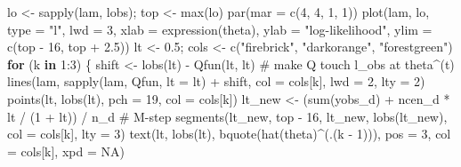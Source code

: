 \documentclass[
  letterpaper,
  DIV=11,
  numbers=noendperiod]{scrreprt}
\newenvironment{Shaded}{\begin{snugshade}}{\end{snugshade}}
\newcommand{\AttributeTok}[1]{\textcolor[rgb]{0.40,0.45,0.13}{#1}}
\newcommand{\CommentTok}[1]{\textcolor[rgb]{0.37,0.37,0.37}{#1}}
\newcommand{\ConstantTok}[1]{\textcolor[rgb]{0.56,0.35,0.01}{#1}}
\newcommand{\ControlFlowTok}[1]{\textcolor[rgb]{0.00,0.23,0.31}{\textbf{#1}}}
\newcommand{\DecValTok}[1]{\textcolor[rgb]{0.68,0.00,0.00}{#1}}
\newcommand{\FloatTok}[1]{\textcolor[rgb]{0.68,0.00,0.00}{#1}}
\newcommand{\FunctionTok}[1]{\textcolor[rgb]{0.28,0.35,0.67}{#1}}
\newcommand{\NormalTok}[1]{\textcolor[rgb]{0.00,0.23,0.31}{#1}}
\newcommand{\OtherTok}[1]{\textcolor[rgb]{0.00,0.23,0.31}{#1}}
\newcommand{\SpecialCharTok}[1]{\textcolor[rgb]{0.37,0.37,0.37}{#1}}
\newcommand{\StringTok}[1]{\textcolor[rgb]{0.13,0.47,0.30}{#1}}
\begin{document}
\begin{Shaded}
\begin{Highlighting}[]
\NormalTok{lo }\OtherTok{\textless{}{-}} \FunctionTok{sapply}\NormalTok{(lam, lobs); top }\OtherTok{\textless{}{-}} \FunctionTok{max}\NormalTok{(lo)}
\FunctionTok{par}\NormalTok{(}\AttributeTok{mar =} \FunctionTok{c}\NormalTok{(}\DecValTok{4}\NormalTok{, }\DecValTok{4}\NormalTok{, }\DecValTok{1}\NormalTok{, }\DecValTok{1}\NormalTok{))}
\FunctionTok{plot}\NormalTok{(lam, lo, }\AttributeTok{type =} \StringTok{"l"}\NormalTok{, }\AttributeTok{lwd =} \DecValTok{3}\NormalTok{, }\AttributeTok{xlab =} \FunctionTok{expression}\NormalTok{(theta),}
     \AttributeTok{ylab =} \StringTok{"log{-}likelihood"}\NormalTok{, }\AttributeTok{ylim =} \FunctionTok{c}\NormalTok{(top }\SpecialCharTok{{-}} \DecValTok{16}\NormalTok{, top }\SpecialCharTok{+} \FloatTok{2.5}\NormalTok{))}
\NormalTok{lt }\OtherTok{\textless{}{-}} \FloatTok{0.5}\NormalTok{; cols }\OtherTok{\textless{}{-}} \FunctionTok{c}\NormalTok{(}\StringTok{"firebrick"}\NormalTok{, }\StringTok{"darkorange"}\NormalTok{, }\StringTok{"forestgreen"}\NormalTok{)}
\ControlFlowTok{for}\NormalTok{ (k }\ControlFlowTok{in} \DecValTok{1}\SpecialCharTok{:}\DecValTok{3}\NormalTok{) \{}
\NormalTok{  shift }\OtherTok{\textless{}{-}} \FunctionTok{lobs}\NormalTok{(lt) }\SpecialCharTok{{-}} \FunctionTok{Qfun}\NormalTok{(lt, lt)            }\CommentTok{\# make Q touch l\_obs at theta\^{}(t)}
  \FunctionTok{lines}\NormalTok{(lam, }\FunctionTok{sapply}\NormalTok{(lam, Qfun, }\AttributeTok{lt =}\NormalTok{ lt) }\SpecialCharTok{+}\NormalTok{ shift, }\AttributeTok{col =}\NormalTok{ cols[k], }\AttributeTok{lwd =} \DecValTok{2}\NormalTok{, }\AttributeTok{lty =} \DecValTok{2}\NormalTok{)}
  \FunctionTok{points}\NormalTok{(lt, }\FunctionTok{lobs}\NormalTok{(lt), }\AttributeTok{pch =} \DecValTok{19}\NormalTok{, }\AttributeTok{col =}\NormalTok{ cols[k])}
\NormalTok{  lt\_new }\OtherTok{\textless{}{-}}\NormalTok{ (}\FunctionTok{sum}\NormalTok{(yobs\_d) }\SpecialCharTok{+}\NormalTok{ ncen\_d }\SpecialCharTok{*}\NormalTok{ lt }\SpecialCharTok{/}\NormalTok{ (}\DecValTok{1} \SpecialCharTok{+}\NormalTok{ lt)) }\SpecialCharTok{/}\NormalTok{ n\_d     }\CommentTok{\# M{-}step}
  \FunctionTok{segments}\NormalTok{(lt\_new, top }\SpecialCharTok{{-}} \DecValTok{16}\NormalTok{, lt\_new, }\FunctionTok{lobs}\NormalTok{(lt\_new), }\AttributeTok{col =}\NormalTok{ cols[k], }\AttributeTok{lty =} \DecValTok{3}\NormalTok{)}
  \FunctionTok{text}\NormalTok{(lt, }\FunctionTok{lobs}\NormalTok{(lt), }\FunctionTok{bquote}\NormalTok{(}\FunctionTok{hat}\NormalTok{(theta)}\SpecialCharTok{\^{}}\NormalTok{(.(k }\SpecialCharTok{{-}} \DecValTok{1}\NormalTok{))), }\AttributeTok{pos =} \DecValTok{3}\NormalTok{, }\AttributeTok{col =}\NormalTok{ cols[k], }\AttributeTok{xpd =} \ConstantTok{NA}\NormalTok{)}

\end{Highlighting}
\end{Shaded}
\end{document}
